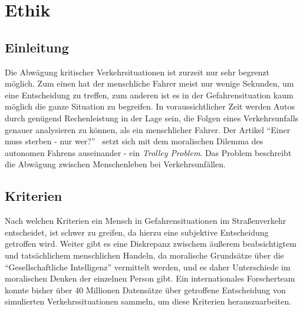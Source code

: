 \documentclass[11pt]{article}
\begin{document}
    \section{Ethik}

    \subsection{Einleitung}

    Die Abwägung kritischer Verkehrsituationen ist zurzeit nur sehr begrenzt möglich. Zum einen hat
    der menschliche Fahrer meist nur wenige Sekunden, um eine Entscheidung zu treffen, zum anderen
    ist es in der Gefahrensituation kaum möglich die ganze Situation zu begreifen. In
    voraussichtlicher Zeit werden Autos durch genügend Rechenleistung in der Lage sein, die Folgen
    eines Verkehrsunfalls genauer analysieren zu können, als ein menschlicher Fahrer.
    Der Artikel "`Einer muss sterben - nur wer?"'~\cite{ethik} setzt sich mit dem moralischen
    Dilemma des autonomen Fahrens auseinander - ein \textit{Trolley Problem}. Das Problem beschreibt
    die Abwägung zwischen Menschenleben bei Verkehrsunfällen.

    \subsection{Kriterien}

    Nach welchen Kriterien ein Mensch in Gefahrensituationen im Straßenverkehr entscheidet, ist
    schwer zu greifen, da hierzu eine subjektive Entscheidung getroffen wird. Weiter gibt
    es eine Diskrepanz zwischem äußerem beabsichtigtem und tatsächlichem menschlichen Handeln, da
    moralische Grundsätze über die "`Gesellschaftliche Intelligenz"' vermittelt werden, und es daher
    Unterschiede im moralischen Denken der einzelnen Person gibt. Ein internationales
    Forscherteam konnte bisher über 40 Millionen Datensätze über getroffene Entscheidung von
    simulierten Verkehrssituationen sammeln, um diese Kriterien herauszuarbeiten.
    \newpage
\end{document}
